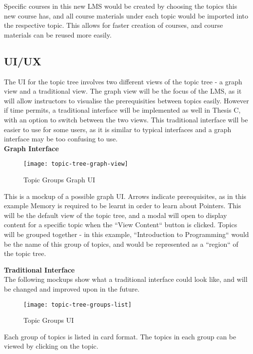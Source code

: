 Specific courses in this new LMS would be created by choosing the topics this new course has, and all course materials under each topic would be imported into the respective topic. This allows for faster creation of courses, and course materials can be reused more easily.\\

\subsection{UI/UX}
The UI for the topic tree involves two different views of the topic tree - a graph view and a traditional view. The graph view will be the focus of the LMS, as it will allow instructors to visualise the prerequisities between topics easily. However if time permits, a traditional interface will be implemented as well in Thesis C, with an option to switch between the two views. This traditional interface will be easier to use for some users, as it is similar to typical interfaces and a graph interface may be too confusing to use.\\

\newpage
\textbf{Graph Interface}

\begin{figure}[h!]
    \centering
    \texttt{[image: topic-tree-graph-view]}
    \caption{Topic Groups Graph UI}
\end{figure}

This is a mockup of a possible graph UI. Arrows indicate prerequisites, as in this example Memory is required to be learnt in order to learn about Pointers. This will be the default view of the topic tree, and a modal will open to display content for a specific topic when the ``View Content`` button is clicked. Topics will be grouped together - in this example, ``Introduction to Programming`` would be the name of this group of topics, and would be represented as a ``region`` of the topic tree.

\textbf{Traditional Interface}\\
The following mockups show what a traditional interface could look like, and will be changed and improved upon in the future.\\
\begin{figure}[h!]
    \centering
    \texttt{[image: topic-tree-groups-list]}
    \caption{Topic Groups UI}
\end{figure}

\newpage

Each group of topics is listed in card format. The topics in each group can be viewed by clicking on the topic.\\

